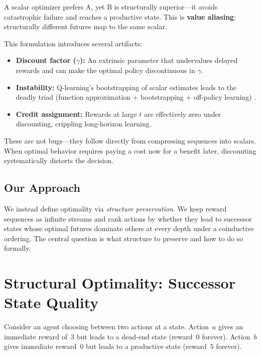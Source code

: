 \documentclass[runningheads]{llncs}
\begin{document}
A scalar optimizer prefers A, yet B is structurally superior---it avoids catastrophic failure and reaches a productive state.  This is \textbf{value aliasing}: structurally different futures map to the same scalar.

This formulation introduces several artifacts:
\begin{itemize}
\item \textbf{Discount factor ($\gamma$):} An extrinsic parameter that undervalues delayed rewards and can make the optimal policy discontinuous in $\gamma$.
\item \textbf{Instability:} Q-learning's bootstrapping of scalar estimates leads to the deadly triad (function approximation $+$ bootstrapping $+$ off-policy learning) \cite{Sutton2018}.
\item \textbf{Credit assignment:} Rewards at large $t$ are effectively zero under discounting, crippling long-horizon learning.
\end{itemize}

\noindent These are not bugs---they follow directly from compressing sequences into scalars.  When optimal behavior requires paying a cost now for a benefit later, discounting systematically distorts the decision.

\subsection{Our Approach}

We instead define optimality via \emph{structure preservation}.  We keep reward sequences as infinite streams and rank actions by whether they lead to successor states whose optimal futures dominate others at every depth under a coinductive ordering.  The central question is what structure to preserve and how to do so formally.


\section{Structural Optimality: Successor State Quality}\label{sec:key-idea}

Consider an agent choosing between two actions at a state.  Action~$a$ gives an immediate reward of~$3$ but leads to a dead-end state (reward~$0$ forever).  Action~$b$ gives immediate reward~$0$ but leads to a productive state (reward~$5$ forever).
\end{document}
